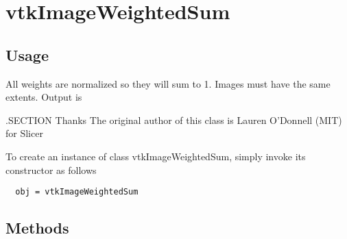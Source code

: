\section{vtkImageWeightedSum}

\subsection{Usage}

 All weights are normalized so they will sum to 1.
 Images must have the same extents. Output is 

 .SECTION Thanks
 The original author of this class is Lauren O'Donnell (MIT) for Slicer

To create an instance of class vtkImageWeightedSum, simply
invoke its constructor as follows
\begin{verbatim}
  obj = vtkImageWeightedSum
\end{verbatim}
\subsection{Methods}


